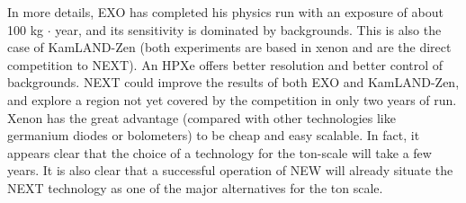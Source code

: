 \documentclass[a4paper,11pt,oneside]{article}
\begin{document}
In more details, EXO has completed his physics run with an exposure of about 100 kg $\cdot$ year, and its sensitivity
is dominated by backgrounds. This is also the case of KamLAND-Zen (both experiments are based in
xenon and are the direct competition to NEXT). An HPXe offers better resolution and better control of
backgrounds. NEXT could improve the results of both EXO and KamLAND-Zen, and explore a region
not yet covered by the competition in only two years of run\cite{Martin-Albo:2015rhw}.
Xenon has the great advantage (compared with other technologies like germanium diodes or bolometers)
to be cheap and easy scalable. In fact, it appears clear that the choice of a technology for the
ton-scale will take a few years. It is also clear that a successful operation of NEW will already situate the
NEXT technology as one of the major alternatives for the ton scale.

\end{document}
